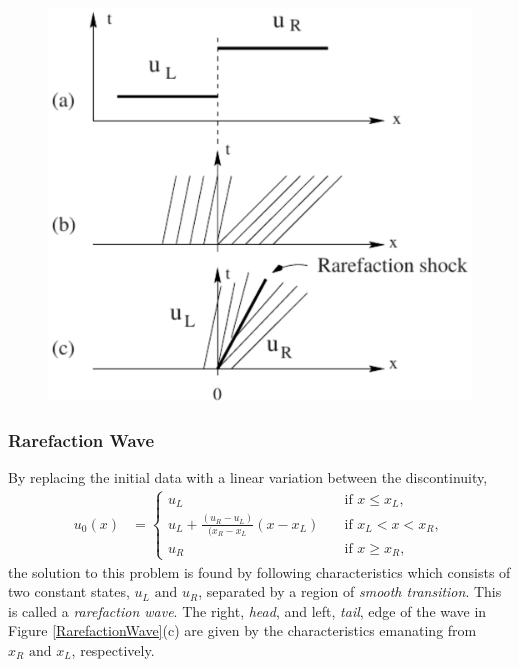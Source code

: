 \documentclass[]{article}
\begin{document}
			\begin{figure}[h] 	
				\centering
				\includegraphics[scale=.55]{RarefactionShock}
				\caption{}
				\label{RarefactionShock}
			\end{figure}

		\subsubsection{Rarefaction Wave}
			By replacing the initial data with a linear variation between the discontinuity,
			\begin{equation}
				\begin{aligned}
					u_0(x) &= \left\{
						\begin{array}{ll}
							u_L & \quad \mbox{if } x \leq x_L, \\
							u_L + \frac{(u_R - u_L)}{(x_R - x_L} (x - x_L)  & \quad \mbox{if } x_L < x < x_R, \\
							u_R & \quad \mbox{if } x \geq x_R,
						\end{array}
					\right.
				\end{aligned}
			\end{equation}
			the solution to this problem is found by following characteristics which consists of two constant states, $ u_L \mbox{ and } u_R $, separated by a region of \textit{smooth transition}. This is called a \textit{rarefaction wave}. The right, \textit{head}, and left, \textit{tail}, edge of the wave in Figure \ref{RarefactionWave}(c) are given by the characteristics emanating from $ x_R \mbox{ and } x_L$, respectively. 
\end{document}
